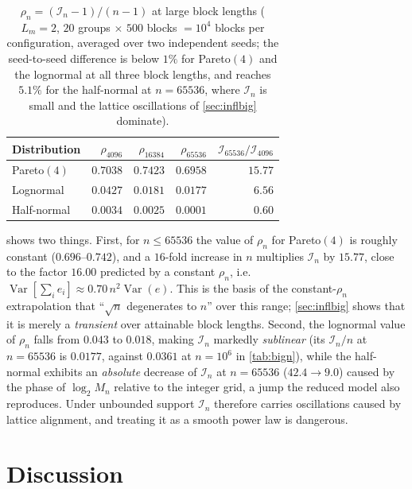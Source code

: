 \documentclass[review,hidelinks,oneeqnum,onetabnum,onefignum,onethmnum]{siamart251216}
\begin{document}
\begin{table}[!tb]
\centering
\caption{$\rho_n=(\mathcal I_n-1)/(n-1)$ at large block lengths ($L_m=2$,
$20$ groups $\times$ $500$ blocks $=10^4$ blocks per configuration, averaged over
two independent seeds; the seed-to-seed difference is below $1\%$ for Pareto$(4)$
and the lognormal at all three block lengths, and reaches $5.1\%$ for the
half-normal at $n=65536$, where $\mathcal I_n$ is small and the lattice
oscillations of \cref{sec:inflbig} dominate).}
\label{tab:largen}
\footnotesize
\begin{tabular}{@{}lrrrr@{}}
\toprule
Distribution & $\rho_{4096}$ & $\rho_{16384}$ & $\rho_{65536}$ & $\mathcal I_{65536}/\mathcal I_{4096}$ \\
\midrule
Pareto$(4)$ & $0.7038$ & $0.7423$ & $0.6958$ & $\mathbf{15.77}$ \\
Lognormal   & $0.0427$ & $0.0181$ & $0.0177$ & $6.56$ \\
Half-normal & $0.0034$ & $0.0025$ & $0.0001$ & $0.60$ \\
\bottomrule
\end{tabular}
\end{table}

 shows two things. First, for $n\le65536$ the value of $\rho_n$
for Pareto$(4)$ is roughly constant ($0.696$--$0.742$), and a $16$-fold increase
in $n$ multiplies $\mathcal I_n$ by $15.77$, close to the factor $16.00$ predicted
by a constant $\rho_n$, i.e.
$\operatorname{Var}[\sum_ie_i]\approx0.70\,n^2\operatorname{Var}(e)$. This is the
basis of the constant-$\rho_n$ extrapolation that ``$\sqrt n$ degenerates to $n$''
over this range; \cref{sec:inflbig} shows that it is merely a \emph{transient}
over attainable block lengths. Second, the lognormal value of $\rho_n$ falls from
$0.043$ to $0.018$, making $\mathcal I_n$ markedly \emph{sublinear} (its
$\mathcal I_n/n$ at $n=65536$ is $0.0177$, against $0.0361$ at $n=10^6$ in
\cref{tab:bign}), while the half-normal exhibits an \emph{absolute} decrease of
$\mathcal I_n$ at $n=65536$ ($42.4\to9.0$) caused by the phase of $\log_2M_n$
relative to the integer grid, a jump the reduced model also reproduces. Under
unbounded support $\mathcal I_n$ therefore carries oscillations caused by lattice
alignment, and treating it as a smooth power law is dangerous.

\section{Discussion}
\label{sec:discussion}
\end{document}
